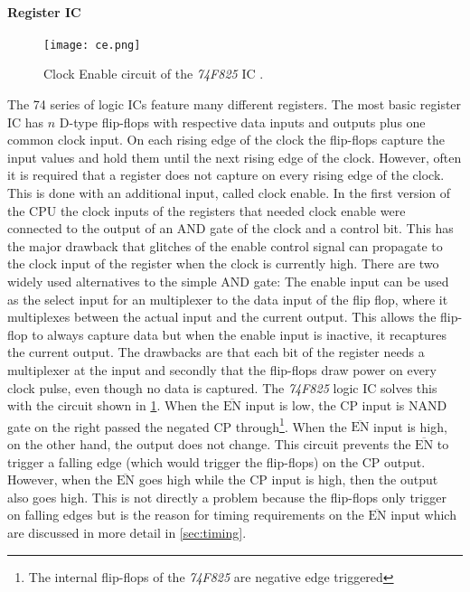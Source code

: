 \paragraph{Register \gls{IC}}
\begin{figure}[t]
  \centering
  \texttt{[image: ce.png]}
  \caption{Clock Enable circuit of the \emph{74F825} \gls{IC} \cite{74f825}.}
  \label{fig:clockEnable}
\end{figure}
The 74 series of logic \glspl{IC} feature many different registers.
The most basic register \gls{IC} has $n$ D-type flip-flops with respective data inputs and outputs plus one common clock input.
On each rising edge of the clock the flip-flops capture the input values and hold them until the next rising edge of the clock.
However, often it is required that a register does not capture on every rising edge of the clock.
This is done with an additional input, called clock enable.
In the first version of the \gls{CPU} the clock inputs of the registers that needed clock enable were connected to the output of an AND gate of the clock and a control bit.
This has the major drawback that glitches of the enable control signal can propagate to the clock input of the register when the clock is currently high.
There are two widely used alternatives to the simple AND gate:
The enable input can be used as the select input for an multiplexer to the data input of the flip flop, where it multiplexes between the actual input and the current output.
This allows the flip-flop to always capture data but when the enable input is inactive, it recaptures the current output.
The drawbacks are that each bit of the register needs a multiplexer at the input and secondly that the flip-flops draw power on every clock pulse, even though no data is captured.
The \emph{74F825} logic \gls{IC} solves this with the circuit shown in \cref{fig:clockEnable}.
When the $\overline{\text{EN}}$ input is low, the CP input is NAND gate on the right passed the negated CP through\footnote{The internal flip-flops of the \emph{74F825} are negative edge triggered}.
When the $\overline{\text{EN}}$ input is high, on the other hand, the output does not change.
This circuit prevents the $\overline{\text{EN}}$ to trigger a falling edge (which would trigger the flip-flops) on the CP output.
However, when the $\overline{\text{EN}}$ goes high while the CP input is high, then the output also goes high.
This is not directly a problem because the flip-flops only trigger on falling edges but is the reason for timing requirements on the $\overline{\text{EN}}$ input which are discussed in more detail in \cref{sec:timing}.
